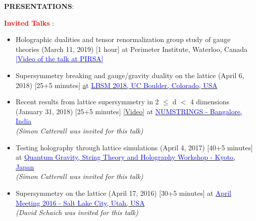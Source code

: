 {\bf PRESENTATIONS}:

\textcolor{red}{\textbf{Invited Talks}} :  
 
 
 \begin{itemize}
  \item Holographic dualities and tensor renormalization group study of gauge theories (March 11, 2019) [1 hour] at Perimeter Institute, Waterloo, Canada 
  \href{http://www.perimeterinstitute.ca/videos/interdisciplinary-seminar-holographic-dualities-and-tensor-renormalization-group-study-gauge}
{\textcolor{blue}{[Video of the talk at PIRSA]}} 
  \end{itemize}
 
 
  \begin{itemize}
  \item Supersymmetry breaking and gauge/gravity duality on the lattice (April 6, 2018) [25+5 minutes] \href{[http://www-hep.colorado.edu/~eneil/lbsm18/talks/Jha.pdf]} at 
  \href{http://www-hep.colorado.edu/~eneil/lbsm18/}{\textcolor{blue}{LBSM 2018, UC Boulder, Colorado, USA}} 
  \end{itemize} 
  
  \begin{itemize}
  \item Recent results from lattice supersymmetry in 2 $\le$ d $<$ 4 dimensions (January 31, 2018) [25+5 minutes] [\href{https://www.youtube.com/watch?v=Zey6DAEiw0c}{Video}] at 
  \href{https://www.icts.res.in/program/NUMSTRINGS2018}{\textcolor{blue}{NUMSTRINGS - Bangalore, India}} 
  \\
  \emph{(Simon Catterall was invited for this talk)} 
  \end{itemize} 
  
 
 \begin{itemize}
 \item Testing holography through lattice simulations (April 4, 2017) [40+5 minutes]  at 
 \href{https://sites.google.com/site/kyotoquantumgravity2017/home/program}{\textcolor{blue}{Quantum Gravity, String Theory and Holography Workshop - Kyoto, Japan}} \\
 \emph{(Simon Catterall was invited for this talk)} 
 \end{itemize}
 
 

\begin{itemize}
\item Supersymmetry on the lattice (April 17, 2016) [30+5 minutes]  at 
\href{https://absuploads.aps.org/presentation.cfm?pid=11807}{\textcolor{blue}{April Meeting 2016 - Salt Lake City, Utah, USA}}  \\
 \emph{(David Schaich was invited for this talk)}
\end{itemize}
  
